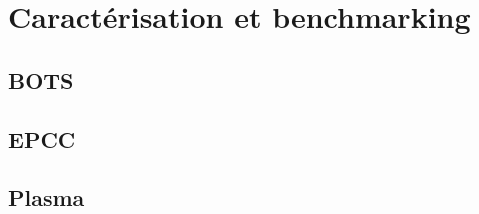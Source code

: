 \section{Caractérisation et benchmarking}\label{sec:rw:benchmarking}


\subsection{BOTS}
\subsection{EPCC}
\subsection{Plasma}

